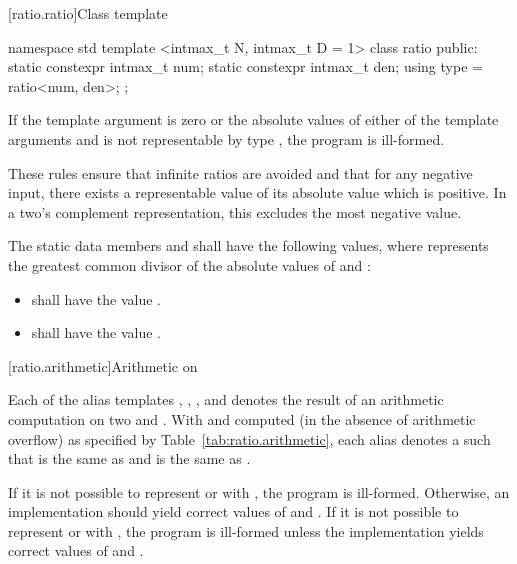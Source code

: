 [ratio.ratio]{Class template }

%
\begin{codeblock}
namespace std {
  template <intmax_t N, intmax_t D = 1>
  class ratio {
  public:
    static constexpr intmax_t num;
    static constexpr intmax_t den;
    using type = ratio<num, den>;
  };
}
\end{codeblock}

\pnum
{}%
If the template argument  is zero or the absolute values of either of the
template arguments  and  is not representable by type
, the program is ill-formed. \begin{note} These rules ensure that infinite
ratios are avoided and that for any negative input, there exists a representable value
of its absolute value which is positive. In a two's complement representation, this
excludes the most negative value. \end{note}

\pnum
The static data members  and  shall have the following values,
where  represents the greatest common divisor of the absolute values of
 and :

\begin{itemize}
\item {} shall have the value .
\item {} shall have the value .
\end{itemize}

[ratio.arithmetic]{Arithmetic on }

\pnum
Each of the alias templates , , ,
and  denotes the result of an arithmetic computation on two
  and . With  and  computed (in the
absence of arithmetic overflow) as specified by Table~\ref{tab:ratio.arithmetic}, each alias
denotes a  such that  is the same as  and
 is the same as .

\pnum
If it is not possible to represent  or  with , the program is
ill-formed. Otherwise, an implementation should yield correct values of  and
. If it is not possible to represent  or  with , the
program is ill-formed unless the implementation yields correct values of  and
.

